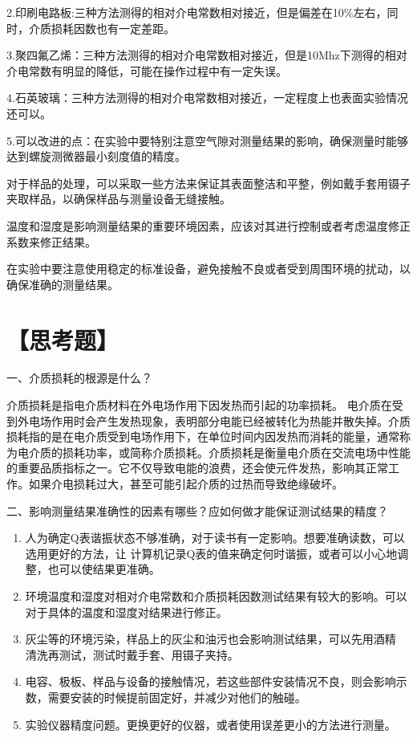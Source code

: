 \documentclass[a4paper,utf8]{article}
\begin{document}
        2.印刷电路板:三种方法测得的相对介电常数相对接近，但是偏差在10\%左右，同时，介质损耗因数也有一定差距。

        3.聚四氟乙烯：三种方法测得的相对介电常数相对接近，但是10Mhz下测得的相对介电常数有明显的降低，可能在操作过程中有一定失误。

        4.石英玻璃：三种方法测得的相对介电常数相对接近，一定程度上也表面实验情况还可以。

        5.可以改进的点：在实验中要特别注意空气隙对测量结果的影响，确保测量时能够达到螺旋测微器最小刻度值的精度。

        对于样品的处理，可以采取一些方法来保证其表面整洁和平整，例如戴手套用镊子夹取样品，以确保样品与测量设备无缝接触。
        
        温度和湿度是影响测量结果的重要环境因素，应该对其进行控制或者考虑温度修正系数来修正结果。
        
        在实验中要注意使用稳定的标准设备，避免接触不良或者受到周围环境的扰动，以确保准确的测量结果。
    



\section*{【思考题】}

\begin{center}
    一、介质损耗的根源是什么？
\end{center}
介质损耗是指电介质材料在外电场作用下因发热而引起的功率损耗。
电介质在受到外电场作用时会产生发热现象，表明部分电能已经被转化为热能并散失掉。介质损耗指的是在电介质受到电场作用下，在单位时间内因发热而消耗的能量，通常称为电介质的损耗功率，或简称介质损耗。介质损耗是衡量电介质在交流电场中性能的重要品质指标之一。它不仅导致电能的浪费，还会使元件发热，影响其正常工作。如果介电损耗过大，甚至可能引起介质的过热而导致绝缘破坏。
\begin{center}
    二、影响测量结果准确性的因素有哪些？应如何做才能保证测试结果的精度？
\end{center}
\begin{enumerate}
    \item 人为确定Q表谐振状态不够准确，对于读书有一定影响。想要准确读数，可以选用更好的方法，让
    计算机记录Q表的值来确定何时谐振，或者可以小心地调整，也可以使结果更准确。
    \item 环境温度和湿度对相对介电常数和介质损耗因数测试结果有较大的影响。可以对于具体的温度和湿度对结果进行修正。
    \item 灰尘等的环境污染，样品上的灰尘和油污也会影响测试结果，可以先用酒精
    清洗再测试，测试时戴手套、用镊子夹持。
    \item 电容、极板、样品与设备的接触情况，若这些部件安装情况不良，则会影响示数，需要安装的时候提前固定好，并减少对他们的触碰。
    \item 实验仪器精度问题。更换更好的仪器，或者使用误差更小的方法进行测量。
\end{enumerate}
\end{document}
